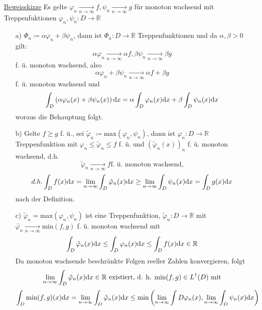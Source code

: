 \underline{Beweisskizze} Es gelte $\varphi_n \xrightarrow[n \to \infty]{} f, \psi_n \xrightarrow[n \to \infty]{}g$ für monoton wachsend mit Treppenfuktionen $\varphi_n, \psi_n \colon D \to \mathbb{R}$
\begin{itemize}
	\item[a)] $\Phi_n \coloneqq \alpha \varphi_n + \beta \psi_n$, dann ist $\Phi_n \colon D \to \mathbb{R}$ Treppenfunktionen und da $\alpha, \beta >0$ gilt: \[\alpha\varphi_n \xrightarrow[n \to \infty]{}\alpha f, \beta\psi_n \xrightarrow[n \to \infty]{}\beta g\] f. ü. monoton wachsend, also \[\alpha \varphi_n + \beta \psi_n \xrightarrow[n \to \infty]{}\alpha f + \beta g\] f. ü. monoton wachsend und \[\int_D \left(\alpha\varphi_n(x) + \beta\psi_n(x)\right) \text{d}x = \alpha \int_D \varphi_n(x)  \text{d}x + \beta\int_D \psi_n(x) \text{d}x\] woraus die Behauptung folgt.
	\item[b)] Gelte $f \geq g$ f. ü., sei $\tilde{\varphi}_n \coloneqq \text{max}(\varphi_n, \psi_n)$, dann ist $\varphi_n \colon D \to  \mathbb{R}$ Treppenfunktion mit $\varphi_n \leq \tilde{\varphi}_n \leq f$ f. ü. und $(\tilde{\varphi}_n(x))_n$ f. ü. monoton wachsend, d.h. \[\tilde{\varphi}_n \xrightarrow[n \to \infty]{}f \text{f. ü. monoton wachsend,}\]
	\[d.h. \int_D f(x) \text{d}x = \lim_{n \to \infty} \int_D \tilde{\varphi}_n(x) \text{d}x \geq \lim_{n \to \infty} \int_D \psi_n(x) \text{d}x = \int_D g(x) \text{d}x\]
	nach der Definition.
	\item[c)] $\tilde{\varphi}_n = \text{max}(\varphi_n,\psi_n)$ ist eine Treppenfunktion, $\tilde{\varphi}_n \colon D \to \mathbb{R}$ mit $\tilde{\varphi_n} \xrightarrow[n \to \infty]{} \text{min}(f,g)$ f. ü. monoton wachsend mit \[\int_D \tilde{\varphi}_n(x) \text{d}x \leq \int_D \varphi_n(x) \text{d}x \leq \int_D f(x) \text{d}x \in \mathbb{R}\] Da monoton wachsende beschränkte Folgen reeller Zahlen konvergieren, folgt \[\lim_{n \to \infty} \int_D \tilde{\varphi}_n(x) \text{d}x \in \mathbb{R} \text{ existiert, d. h. min}(f,g) \in L^\uparrow(D) \text{ mit}\] \[\int_D \text{min}(f,g)(x) \text{d}x = \lim_{n \to \infty} \int_D \tilde{\varphi}_n(x) \text{d}x \leq \text{min}\left(\lim_{n \to \infty} \int{D}{\varphi_n(x)}, \lim_{n \to \infty} \int_D \psi_n(x) \text{d}x\right)\]
\end{itemize}
